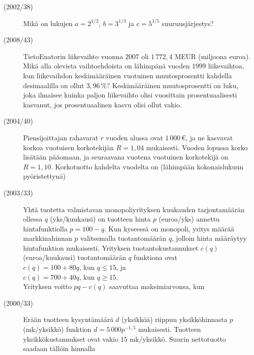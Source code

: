 \begin{description}
	\item[(2002/38)] Mikä on lukujen $a=2^{1/2}$, $b=3^{1/3}$ ja $c=5^{1/5}$ suuruusjärjestys?


	\item[(2008/43)] TietoEnatorin liikevaihto vuonna $2007$ oli $1\,772,4$ MEUR (miljoona euroa). Mikä
	alla olevista vaihtoehdoista on lähimpänä vuoden $1999$ liikevaihtoa, kun
	liikevaihdon keskimääräinen vuotuinen muutosprosentti kahdella desimaalilla on
	ollut $3,96$\,\%? Keskimääräinen muutosprosentti on luku, joka ilmaisee kuinka paljon
	liikevaihto olisi vuosittain prosentuaalisesti kasvanut, jos prosentuaalinen kasvu olisi
	ollut vakio.
        


	\item[(2004/40)] Piensijoittajan rahavarat $r$ vuoden alussa ovat $1\,000$\,€, ja ne kasvavat korkoa vuotuisen korkotekijän $R=1,04$ mukaisesti. Vuoden lopussa korko lisätään pääomaan, ja seuraavana vuotena vuotuinen korkotekijä on $R=1,10$. Korkotuotto kahdelta vuodelta on (lähimpään kokonaislukuun pyöristettynä)
        


	\item[(2003/33)] Yhtä tuotetta valmistavan monopoliyrityksen kuukauden tarjontamäärän ollessa $q$ (yks/kuukausi) on tuotteen hinta $p$ (euroa/yks) annettu hintafunktiolla $p = 100-q$. Kun kyseessä on monopoli, yritys määrää markkinahinnan $p$ valitsemalla tuotantomäärän $q$, jolloin hinta määräytyy hintafunktion mukaisesti. Yrityksen tuotantokustannukset $c(q)$ (euroa/kuukausi) tuotantomäärän $q$ funktiona ovat\\
$c(q)=100+80q$, kun $q\leq 15$, ja\\
$c(q)=700+40q$, kun $q\geq 15$.\\
Yrityksen voitto $pq-c(q)$ saavuttaa maksimiarvonsa, kun
        


	\item[(2000/33)] Erään tuotteen kysyntämäärä $d$ (yksikköä) riippuu yksikköhinnasta $p$ (mk/yksikkö) funktion $d=5\,000p^{-1{,}5}$ mukaisesti. Tuotteen yksikkökustannukset ovat vakio $15$ mk/yksikkö. Suurin nettotuotto saadaan tällöin hinnalla
        

	
\end{description}
